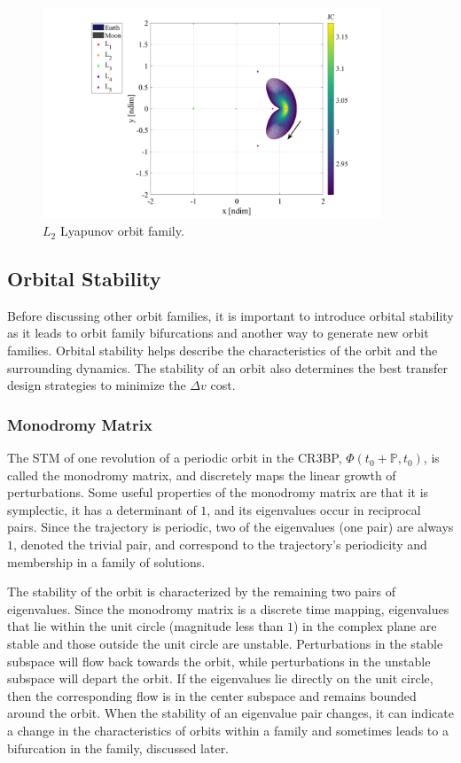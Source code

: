 \begin{figure}[ht]
    \centering
    \includegraphics[width=0.9\textwidth]{figures/L2LyapunovFamily.pdf}
    \caption{$L_{2}$ Lyapunov orbit family.}
    \label{fig:L2Lyapunov}
\end{figure}

\subsection{Orbital Stability}
Before discussing other orbit families, it is important to introduce orbital stability as it leads
to orbit family bifurcations and another way to generate new orbit families. Orbital stability
helps describe the characteristics of the orbit and the surrounding dynamics. The stability of an
orbit also determines the best transfer design strategies to minimize the $\Delta v$ cost. 

\subsubsection{Monodromy Matrix}
The STM of one revolution of a periodic orbit in the CR3BP, $\Phi(t_{0}+\mathbb{P},t_{0})$, is
called the monodromy matrix, and discretely maps the linear growth of perturbations. Some
useful properties of the monodromy matrix are that it is symplectic, it has a determinant of $1$,
and its eigenvalues occur in reciprocal pairs\cite{ZimovanSpreen:2021}. Since the trajectory is
periodic, two of the eigenvalues (one pair) are always $1$, denoted the trivial pair, and
correspond to the trajectory's periodicity and membership in a family of solutions.

The stability of the orbit is characterized by the remaining two pairs of eigenvalues. Since the
monodromy matrix is a discrete time mapping, eigenvalues that lie within the unit circle (magnitude
less than $1$) in the complex plane are stable and those outside the unit circle are unstable.
Perturbations in the stable subspace will flow back towards the orbit, while perturbations in the
unstable subspace will depart the orbit. If the eigenvalues lie directly on the unit circle, then
the corresponding flow is in the center subspace and remains bounded around the orbit. When the
stability of an eigenvalue pair changes, it can indicate a change in the characteristics of orbits
within a family and sometimes leads to a bifurcation in the family, discussed later.

